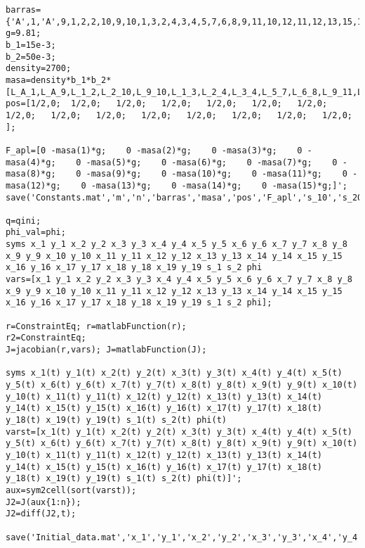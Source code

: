 \begin{lstlisting}[style=codematlab]
barras={'A',1,'A',9,1,2,2,10,9,10,1,3,2,4,3,4,5,7,6,8,9,11,10,12,11,12,13,15,14,16};
g=9.81;
b_1=15e-3;
b_2=50e-3;
density=2700;
masa=density*b_1*b_2*[L_A_1,L_A_9,L_1_2,L_2_10,L_9_10,L_1_3,L_2_4,L_3_4,L_5_7,L_6_8,L_9_11,L_10_12,L_11_12,L_13_15,L_14_16];
pos=[1/2,0;  1/2,0;   1/2,0;   1/2,0;   1/2,0;   1/2,0;   1/2,0;   1/2,0;   1/2,0;   1/2,0;   1/2,0;   1/2,0;   1/2,0;   1/2,0;   1/2,0;   ];

F_apl=[0 -masa(1)*g;    0 -masa(2)*g;    0 -masa(3)*g;    0 -masa(4)*g;    0 -masa(5)*g;    0 -masa(6)*g;    0 -masa(7)*g;    0 -masa(8)*g;    0 -masa(9)*g;    0 -masa(10)*g;    0 -masa(11)*g;    0 -masa(12)*g;    0 -masa(13)*g;    0 -masa(14)*g;    0 -masa(15)*g;]';
save('Constants.mat','m','n','barras','masa','pos','F_apl','s_10','s_20','L_A_1','L_A_9','L_A_2','L_A_10','L_1_2','L_9_10','L_2_10','L_A_17','L_1_18','L_1_3','L_9_19','L_9_11','L_2_4','L_10_12','L_3_5','L_3_4','L_11_13','L_11_12','L_5_7','L_6_7','L_4_5','L_13_15','L_14_15','L_12_13','L_6_8','L_14_16','x_A','y_A','x_B','y_B','x_C','y_C','kingpin','track');

q=qini;
phi_val=phi;
syms x_1 y_1 x_2 y_2 x_3 y_3 x_4 y_4 x_5 y_5 x_6 y_6 x_7 y_7 x_8 y_8 x_9 y_9 x_10 y_10 x_11 y_11 x_12 y_12 x_13 y_13 x_14 y_14 x_15 y_15 x_16 y_16 x_17 y_17 x_18 y_18 x_19 y_19 s_1 s_2 phi
vars=[x_1 y_1 x_2 y_2 x_3 y_3 x_4 y_4 x_5 y_5 x_6 y_6 x_7 y_7 x_8 y_8 x_9 y_9 x_10 y_10 x_11 y_11 x_12 y_12 x_13 y_13 x_14 y_14 x_15 y_15 x_16 y_16 x_17 y_17 x_18 y_18 x_19 y_19 s_1 s_2 phi];

r=ConstraintEq; r=matlabFunction(r);
r2=ConstraintEq;
J=jacobian(r,vars); J=matlabFunction(J);

syms x_1(t) y_1(t) x_2(t) y_2(t) x_3(t) y_3(t) x_4(t) y_4(t) x_5(t) y_5(t) x_6(t) y_6(t) x_7(t) y_7(t) x_8(t) y_8(t) x_9(t) y_9(t) x_10(t) y_10(t) x_11(t) y_11(t) x_12(t) y_12(t) x_13(t) y_13(t) x_14(t) y_14(t) x_15(t) y_15(t) x_16(t) y_16(t) x_17(t) y_17(t) x_18(t) y_18(t) x_19(t) y_19(t) s_1(t) s_2(t) phi(t)
varst=[x_1(t) y_1(t) x_2(t) y_2(t) x_3(t) y_3(t) x_4(t) y_4(t) x_5(t) y_5(t) x_6(t) y_6(t) x_7(t) y_7(t) x_8(t) y_8(t) x_9(t) y_9(t) x_10(t) y_10(t) x_11(t) y_11(t) x_12(t) y_12(t) x_13(t) y_13(t) x_14(t) y_14(t) x_15(t) y_15(t) x_16(t) y_16(t) x_17(t) y_17(t) x_18(t) y_18(t) x_19(t) y_19(t) s_1(t) s_2(t) phi(t)]';
aux=sym2cell(sort(varst));
J2=J(aux{1:n});
J2=diff(J2,t);

save('Initial_data.mat','x_1','y_1','x_2','y_2','x_3','y_3','x_4','y_4','x_5','y_5','x_6','y_6','x_7','y_7','x_8','y_8','x_9','y_9','x_10','y_10','x_11','y_11','x_12','y_12','x_13','y_13','x_14','y_14','x_15','y_15','x_16','y_16','x_17','y_17','x_18','y_18','x_19','y_19','s_1','s_2','phi','vars','varst','r','r2','J','J2');%,'x_1(t)','y_1(t)','x_2(t)','y_2(t)','x_3(t)','s(t)','phi(t)','varst')


\end{lstlisting}

